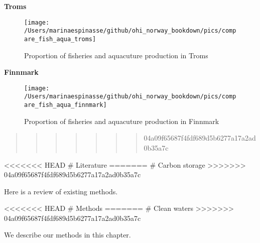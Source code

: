 \documentclass[
]{book}
\begin{document}
{\textbf{Troms}}

\begin{figure}

{\centering \texttt{[image: /Users/marinaespinasse/github/ohi\_norway\_bookdown/pics/compare\_fish\_aqua\_troms]} 

}

\caption{Proportion of fisheries and aquacuture production in Troms}\label{fig:fishakva3}
\end{figure}

{\textbf{Finnmark}}

\begin{figure}

{\centering \texttt{[image: /Users/marinaespinasse/github/ohi\_norway\_bookdown/pics/compare\_fish\_aqua\_finnmark]} 

}

\caption{Proportion of fisheries and aquacuture production in Finnmark}\label{fig:fishaakva1}
\end{figure}

\begin{quote}
\begin{quote}
\begin{quote}
\begin{quote}
\begin{quote}
\begin{quote}
\begin{quote}
04a09f65687f4fdf689d5b6277a17a2ad0b35a7c
\end{quote}
\end{quote}
\end{quote}
\end{quote}
\end{quote}
\end{quote}
\end{quote}

\textless\textless\textless\textless\textless\textless\textless{} HEAD
\# Literature
=======
\# Carbon storage
\textgreater\textgreater\textgreater\textgreater\textgreater\textgreater\textgreater{} 04a09f65687f4fdf689d5b6277a17a2ad0b35a7c

Here is a review of existing methods.

\textless\textless\textless\textless\textless\textless\textless{} HEAD
\# Methods
=======
\# Clean waters
\textgreater\textgreater\textgreater\textgreater\textgreater\textgreater\textgreater{} 04a09f65687f4fdf689d5b6277a17a2ad0b35a7c

We describe our methods in this chapter.

  
\end{document}

